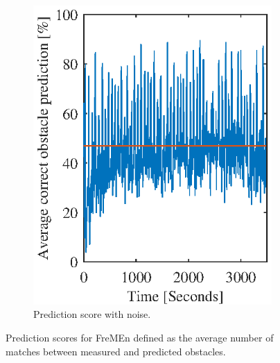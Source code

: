 \begin{figure}[htbp]
\begin{subfigure}[t]{0.49\textwidth}
        \includegraphics[width=1.0\textwidth]{chapters/mapping_of_dynamic_areas/figures/fremen_avg_miss_with_noise}
        \caption{Prediction score with noise.}
        \label{fig:fremen_avg_miss_with_noise}
    \end{subfigure}
    \caption{Prediction scores for FreMEn defined as the average number of matches between measured and predicted obstacles.}
    \label{fig:fremen_avg_correct_predictions}
\end{figure}
